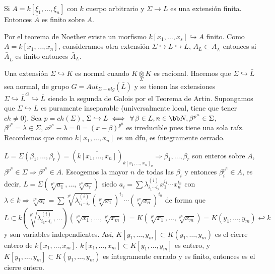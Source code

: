 \begin{teo} 
Si $A = k[\xi_1, \ldots, \xi_n]$ con $k$ cuerpo arbitrario y $\Sigma \longrightarrow L$ es una extensi\'on finita. Entonces $\bar A$ es finito sobre $A$. 
\end{teo}
\begin{dem}
    Por el teorema de Noether existe un morfismo $k[x_1, \ldots,x_s]\hookrightarrow A$ finito. Como $A = k[x_1, \ldots, x_n]$, consideramos otra extensi\'on $\Sigma \hookrightarrow L \hookrightarrow \bar L$, $\bar A_L \subset \bar A_{\bar L}$ entonces si $\bar A_{\bar L}$ es finito entonces $\bar A_L$. 

    Una extensi\'on $\Sigma \hookrightarrow K$ es normal cuando $K\underset{\Sigma}{\otimes} K$ es racional. Hacemos que $\Sigma \hookrightarrow \bar L$ sea normal, de grupo $G = Aut_{\Sigma-alg}(\bar L)$ y se tienen las extensiones $\Sigma \hookrightarrow \bar L^G \hookrightarrow \bar L$ siendo la segunda de Galois por el Teorema de Artin. Supongamos que $\Sigma \hookrightarrow L$ es puramente inseparable (universalmente local, tiene que tener $ch \neq 0$). Sea $p=ch(\Sigma)$, $\Sigma \hookrightarrow L \iff \,\forall\, \beta \in L,n \in \bb N,  \beta^{p^n} \in \Sigma$, $\beta^{p^n} = \lambda \in \Sigma, \, x^{p^n} - \lambda = 0 = (x-\beta)^{p^n}$ es irreducible pues tiene una sola ra\'iz. Recordemos que como $k[x_1, \ldots, x_n]$ es un dfu, es \'integramente cerrado.

    $L=\Sigma(\beta_1, \ldots, \beta_r) =\left( \overline{k[x_1, \ldots, x_n]}\right)_{k[x_1, \ldots, x_n]_o} \Rightarrow \beta_1, \ldots, \beta_r$ son enteros sobre $A$, $\beta^{p^n} \in\Sigma \Rightarrow \beta^{p^n}\in A$. Escogemos la mayor $n$ de todas las $\beta_i$ y entonces $\beta_i^{p^n} \in A$, es decir, $L=\Sigma(\sqrt[p^n]{a_1}, \ldots, \sqrt[p^n]{a_r})$ siedo $a_i = \sum \lambda_{i_1\cdots i_r}^{(i)} x^{i_1}_1 \cdots x^{i_n}_n$ con $\lambda\in k\Rightarrow \sqrt[p^n]{a_i} = \sum \sqrt[p^n]{ \lambda_{i_1\cdots i_r}^{(i)}}  (\sqrt[p^n]{x_1})^{i_1} \cdots (\sqrt[p^n]{x_n})^{i_n} $ de forma que 
    $$L \subset k \left( \sqrt[p^n]{ \lambda_{i_1\cdots i_r}^{(i)}}, \ldots \right)\left(\sqrt[p^n]{x_1}, \ldots,  \sqrt[p^n]{x_m}\right) = K\left(\sqrt[p^n]{x_1}, \ldots,  \sqrt[p^n]{x_m}\right) = K(y_1, \ldots, y_m) \hookleftarrow k$$ y son variables independientes. As\'i, $K[y_1, \ldots, y_m]\subset K(y_1, \ldots, y_m)$ es el cierre entero de $k[x_1, \ldots, x_m]$. $k[x_1, \ldots, x_m] \subset K[y_1, \ldots, y_m]$ es entero, y $K[y_1, \ldots, y_m]\subset K(y_1, \ldots, y_m)$ es \'integramente cerrado y es finito, entonces es el cierre entero. 
\end{dem}

